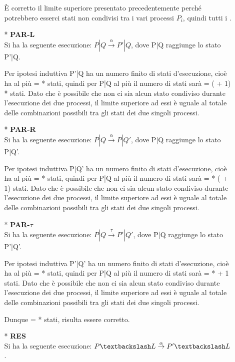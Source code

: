 \begin{itemize}
\begin{itemize}
		È corretto il limite superiore presentato precedentemente perché potrebbero esserci stati non condivisi tra i vari processi $P_{i}$, quindi tutti i .
		\\
		\item[*] \textbf{PAR-L}
		\\
		Si ha la seguente esecuzione: $P|Q \overset{\alpha}\rightarrow P'|Q$, dove P|Q raggiunge lo stato P'|Q.
		
		Per ipotesi induttiva P'|Q ha un numero finito di stati d'esecuzione, cioè ha al più  =  *  stati, quindi per P|Q al più il numero di stati sarà  = ( + 1) *  stati. Dato che è possibile che non ci sia alcun stato condiviso durante l'esecuzione dei due processi, il limite superiore ad essi è uguale al totale delle combinazioni possibili tra gli stati dei due singoli processi.	
		\\
		\item[*] \textbf{PAR-R}
		\\
		Si ha la seguente esecuzione: $P|Q \overset{\alpha}\rightarrow P|Q'$, dove P|Q raggiunge lo stato P|Q'.
		
		Per ipotesi induttiva P|Q' ha un numero finito di stati d'esecuzione, cioè ha al più  =  *  stati, quindi per P|Q al più il numero di stati sarà  =  * ( + 1) stati. Dato che è possibile che non ci sia alcun stato condiviso durante l'esecuzione dei due processi, il limite superiore ad essi è uguale al totale delle combinazioni possibili tra gli stati dei due singoli processi.
		\\
		\item[*] \textbf{PAR-$\tau$}
		\\
		Si ha la seguente esecuzione: $P|Q \overset{\tau}\rightarrow P'|Q'$, dove P|Q raggiunge lo stato P'|Q'.
		
		Per ipotesi induttiva P'|Q' ha un numero finito di stati d'esecuzione, cioè ha al più  =  *  stati, quindi per P|Q al più il numero di stati sarà  =  *  + 1 stati. Dato che è possibile che non ci sia alcun stato condiviso durante l'esecuzione dei due processi, il limite superiore ad essi è uguale al totale delle combinazioni possibili tra gli stati dei due singoli processi.
		
		Dunque  =  *  stati, risulta essere corretto.
		\\
		\item[*] \textbf{RES}
		\\
		Si ha la seguente esecuzione: $P \textbackslash L \overset{\alpha}\rightarrow P' \textbackslash L$. 
		

\end{itemize}
\end{itemize}
